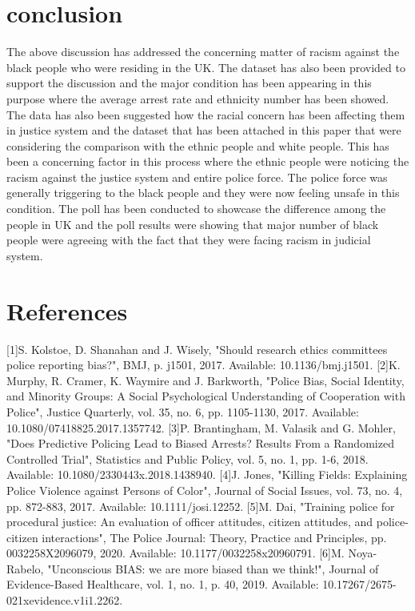 \documentclass[conference]{IEEEtran}
\begin{document}
\section{conclusion}
The above discussion has addressed the concerning matter of racism against the black people who were residing in the UK. The dataset has also been provided to support the discussion and the major condition has been appearing in this purpose where the average arrest rate and ethnicity number has been showed. The data has also been suggested how the racial concern has been affecting them in justice system and the dataset that has been attached in this paper that were considering the comparison with the ethnic people and white people. This has been a concerning factor in this process where the ethnic people were noticing the racism against the justice system and entire police force. The police force was generally triggering to the black people and they were now feeling unsafe in this condition. The poll has been conducted to showcase the difference among the people in UK and the poll results were showing that major number of black people were agreeing with the fact that they were facing racism in judicial system. 




\section*{References}



\begin{thebibliography}{00}
 [1]S. Kolstoe, D. Shanahan and J. Wisely, "Should research ethics committees police reporting bias?", BMJ, p. j1501, 2017. Available: 10.1136/bmj.j1501.
 [2]K. Murphy, R. Cramer, K. Waymire and J. Barkworth, "Police Bias, Social Identity, and Minority Groups: A Social Psychological Understanding of Cooperation with Police", Justice Quarterly, vol. 35, no. 6, pp. 1105-1130, 2017. Available: 10.1080/07418825.2017.1357742.
 [3]P. Brantingham, M. Valasik and G. Mohler, "Does Predictive Policing Lead to Biased Arrests? Results From a Randomized Controlled Trial", Statistics and Public Policy, vol. 5, no. 1, pp. 1-6, 2018. Available: 10.1080/2330443x.2018.1438940.
[4]J. Jones, "Killing Fields: Explaining Police Violence against Persons of Color", Journal of Social Issues, vol. 73, no. 4, pp. 872-883, 2017. Available: 10.1111/josi.12252.
[5]M. Dai, "Training police for procedural justice: An evaluation of officer attitudes, citizen attitudes, and police-citizen interactions", The Police Journal: Theory, Practice and Principles, pp. 0032258X2096079, 2020. Available: 10.1177/0032258x20960791.
[6]M. Noya-Rabelo, "Unconscious BIAS: we are more biased than we think!", Journal of Evidence-Based Healthcare, vol. 1, no. 1, p. 40, 2019. Available: 10.17267/2675-021xevidence.v1i1.2262.

\end{thebibliography}
\end{document}
